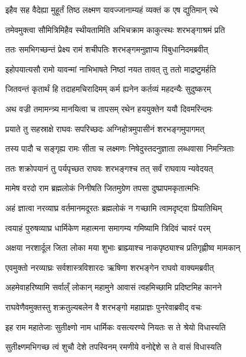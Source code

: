 \twolineshloka
{इहैव सह वैदेह्या मुहूर्तं तिष्ठ लक्ष्मण}
{यावज्जानाम्यहं व्यक्तं क एष द्युतिमान् रथे} %

\twolineshloka
{तमेवमुक्त्वा सौमित्रिमिहैव स्थीयतामिति}
{अभिचक्राम काकुत्स्थः शरभङ्गाश्रमं प्रति} %

\twolineshloka
{ततः समभिगच्छन्तं प्रेक्ष्य रामं शचीपतिः}
{शरभङ्गमनुज्ञाप्य विबुधानिदमब्रवीत्} %

\twolineshloka
{इहोपयात्यसौ रामो यावन्मां नाभिभाषते}
{निष्ठां नयत तावत् तु ततो माद्रष्टुमर्हति} %

\twolineshloka
{जितवन्तं कृतार्थं हि तदाहमचिरादिमम्}
{कर्म ह्यनेन कर्तव्यं महदन्यैः सुदुष्करम्} %

\twolineshloka
{अथ वज्री तमामन्त्र्य मानयित्वा च तापसम्}
{रथेन हययुक्तेन ययौ दिवमरिन्दमः} %

\twolineshloka
{प्रयाते तु सहस्राक्षे राघवः सपरिच्छदः}
{अग्निहोत्रमुपासीनं शरभङ्गमुपागमत्} %

\twolineshloka
{तस्य पादौ च सङ्गृह्य रामः सीता च लक्ष्मणः}
{निषेदुस्तदनुज्ञाता लब्धवासा निमन्त्रिताः} %

\twolineshloka
{ततः शक्रोपयानं तु पर्यपृच्छत राघवः}
{शरभङ्गश्च तत् सर्वं राघवाय न्यवेदयत्} %

\twolineshloka
{मामेष वरदो राम ब्रह्मलोकं निनीषति}
{जितमुग्रेण तपसा दुष्प्रापमकृतात्मभिः} %

\twolineshloka
{अहं ज्ञात्वा नरव्याघ्र वर्तमानमदूरतः}
{ब्रह्मलोकं न गच्छामि त्वामदृष्ट्वा प्रियातिथिम्} %

\twolineshloka
{त्वयाहं पुरुषव्याघ्र धार्मिकेण महात्मना}
{समागम्य गमिष्यामि त्रिदिवं चावरं परम्} %

\twolineshloka
{अक्षया नरशार्दूल जिता लोका मया शुभाः}
{ब्राह्म्याश्च नाकपृष्ठ्याश्च प्रतिगृह्णीष्व मामकान्} %

\twolineshloka
{एवमुक्तो नरव्याघ्रः सर्वशास्त्रविशारदः}
{ऋषिणा शरभङ्गेन राघवो वाक्यमब्रवीत्} %

\twolineshloka
{अहमेवाहरिष्यामि सर्वाल्ँ लोकान् महामुने}
{आवासं त्वहमिच्छामि प्रदिष्टमिह कानने} %

\twolineshloka
{राघवेणैवमुक्तस्तु शक्रतुल्यबलेन वै}
{शरभङ्गो महाप्राज्ञः पुनरेवाब्रवीद् वचः} %

\twolineshloka
{इह राम महातेजाः सुतीक्ष्णो नाम धार्मिकः}
{वसत्यरण्ये नियतः स ते श्रेयो विधास्यति} %

\twolineshloka
{सुतीक्ष्णमभिगच्छ त्वं शुचौ देशे तपस्विनम्}
{रमणीये वनोद्देशे स ते वासं विधास्यति} %

